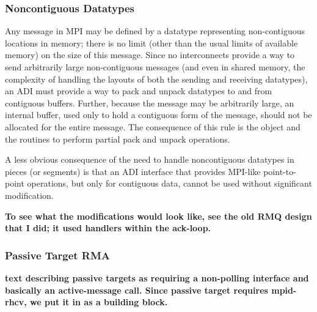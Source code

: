 \documentclass{article}
\begin{document}
\subsubsection{Noncontiguous Datatypes}
Any message in MPI may be defined by a datatype representing
non-contiguous locations in memory; there is no limit (other than the
usual limits of available memory) on the size of this message.  Since
no interconnects provide a way to send arbitrarily large
non-contiguous messages (and even in shared memory, the complexity of
handling the layouts of both the sending and receiving datatypes), an
ADI must provide a way to pack and unpack datatypes to and from
contiguous buffers.  
Further, because the message may be arbitrarily large, an internal
buffer,
used only to hold a contiguous form of the message, should
not be allocated for the entire message.
The consequence of this rule is the  object and the
routines to perform partial pack and unpack operations.

A less obvious consequence of the need to handle noncontiguous
datatypes in pieces (or segments) is that an ADI interface that
provides MPI-like point-to-point operations, but only for contiguous
data, cannot be used without significant modification.  

\textbf{To see what the modifications would look like, see the old RMQ design that I did; it used
handlers within the ack-loop.} 

\subsubsection{Passive Target RMA}
\label{sec-passive-target}
\textbf{text describing passive targets as requiring a non-polling
interface and basically an active-message call.  Since passive target
requires mpid-rhcv, we put it in as a building block.}
\end{document}
